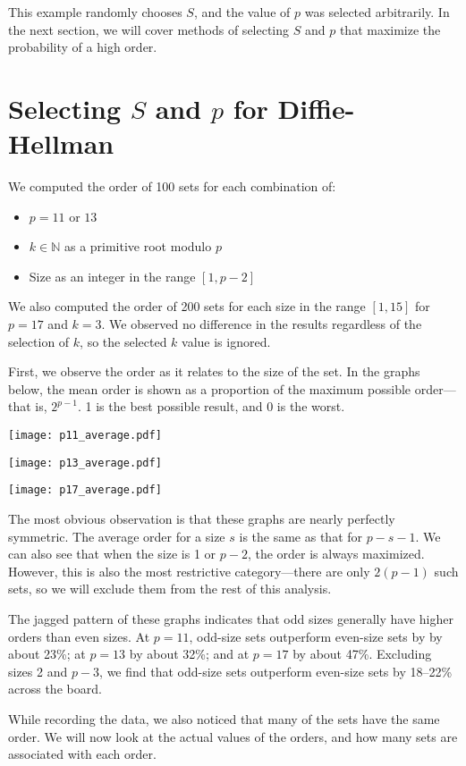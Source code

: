 \documentclass{article}
\newcommand{\N}{\mathbb{N}}
\begin{document}
This example randomly chooses $S$, and the value of $p$
was selected arbitrarily.
In the next section, we will cover
methods of selecting $S$ and $p$ that maximize the probability
of a high order.

\section{Selecting $S$ and $p$ for Diffie-Hellman}

We computed the order of 100 sets for each combination of:
\begin{itemize}
    \item $p = 11$ or $13$
    \item $k \in \N$ as a primitive root modulo $p$
    \item Size as an integer in the range $[1, p-2]$
\end{itemize}
We also computed the order of 200 sets for each size in the range
$[1, 15]$ for $p = 17$ and $k = 3$. We observed no difference in
the results regardless of the selection of $k$, so the selected
$k$ value is ignored.

First, we observe the order as it relates to the size of the set.
In the graphs below, the mean order is shown as a proportion of the
maximum possible order---that is, $2^{p-1}$. 1 is the best possible
result, and 0 is the worst.

\texttt{[image: p11\_average.pdf]}

\texttt{[image: p13\_average.pdf]}

\texttt{[image: p17\_average.pdf]}

The most obvious observation is that these graphs are nearly
perfectly symmetric. The average order for a size $s$
is the same as that for $p - s - 1$.
We can also see that when the size is 1 or $p - 2$,
the order is always maximized. However, this is also the most
restrictive category---there are only $2(p-1)$ such sets,
so we will exclude them from the rest of this analysis.

The jagged pattern of these graphs indicates that odd sizes
generally have higher orders than even sizes. At $p = 11$,
odd-size sets outperform even-size sets by by about 23\%;
at $p = 13$ by about 32\%; and at $p = 17$ by about 47\%.
Excluding sizes 2 and $p - 3$, we find that odd-size
sets outperform even-size sets by 18--22\% across the board.

While recording the data, we also noticed that many of the
sets have the same order. We will now look at the actual values
of the orders, and how many sets are associated with each order.
\end{document}

